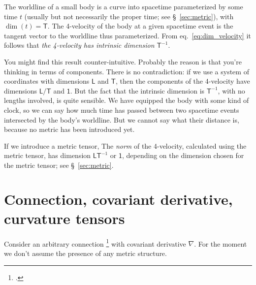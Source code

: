 \documentclass[\ifafour a4paper,12pt,\else a5paper,10pt,\fi%
onecolumn,oneside,article,%
british%
]{memoir}
\theoremstyle{remark}
\theoremstyle{innote}
\newcommand*{\citep}{\footcites}
\renewcommand*{\|}[1][]{\nonscript\,#1\vert\nonscript\;\mathopen{}}
\newcommand*{\sect}{\S}%
\newcommand*{\eqn}{eq.}%
\newcommand*{\Un}{\textsf{1}}
\newcommand*{\Le}{\textsf{L}}
\newcommand*{\Ti}{\textsf{T}}
\newcommand*{\nab}{\nabla}
\begin{document}
\medskip

The worldline of a small body is a curve into spacetime parameterized by
some time $t$ (usually but not necessarily the proper time; see
\sect~\ref{sec:metric}), with $\dim(t) = \Ti$. The 4-velocity of the body
at a given spacetime event is the tangent vector to the worldline thus
parameterized. From \eqn~\eqref{eq:dim_velocity} it follows that \emph{the
  4-velocity has intrinsic dimension $\Ti^{-1}$}.

You might find this result counter-intuitive. Probably the reason is that
you're thinking in terms of components. There is no contradiction: if we
use a system of coordinates with dimensions $\Le$ and $\Ti$, then the
components of the 4-velocity have dimensions $\Le/\Ti$ and $\Un$. But the
fact that the intrinsic dimension is $\Ti^{-1}$, with no lengths involved,
is quite sensible. We have equipped the body with some kind of clock, so we
can say how much time has passed between two spacetime events intersected
by the body's worldline. But we cannot say what their distance is, because
no metric has been introduced yet.

If we introduce a metric tensor, The \emph{norm} of the 4-velocity,
calculated using the metric tensor, has dimension $\Le \Ti^{-1}$ or $\Un$,
depending on the dimension chosen for the metric tensor; see
\sect~\ref{sec:metric}.






\section{Connection, covariant derivative, curvature tensors}
\label{sec:connection}

Consider an arbitrary connection
\citep[\sect~V.B]{choquetbruhatetal1977_r1996} with covariant derivative
$\nab$. For the moment we don't assume the presence of any metric
structure.
\end{document}
